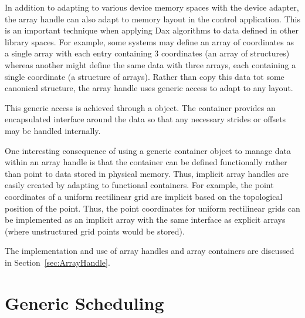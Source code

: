In addition to adapting to various device memory spaces with the device
adapter, the array handle can also adapt to memory layout in the control
application. This is an important technique when applying Dax algorithms to
data defined in other library spaces. For example, some systems may define
an array of coordinates as a single array with each entry containing 3
coordinates (an array of structures) whereas another might define the same
data with three arrays, each containing a single coordinate (a structure of
arrays). Rather than copy this data tot some canonical structure, the array
handle uses generic access to adapt to any layout.


This generic access is achieved through a 
 object. The container provides an encapsulated
interface around the data so that any necessary strides or offsets may be
handled internally.


One interesting consequence of using a generic container object to manage
data within an array handle is that the container can be defined
functionally rather than point to data stored in physical memory. Thus,
implicit array handles are easily created by adapting to functional
containers. For example, the point coordinates of a uniform rectilinear
grid are implicit based on the topological position of the point. Thus, the
point coordinates for uniform rectilinear grids can be implemented as an
implicit array with the same interface as explicit arrays (where
unstructured grid points would be stored).

The implementation and use of array handles and array containers are
discussed in Section~\ref{sec:ArrayHandle}.


\section{Generic Scheduling}
\label{sec:GenericScheduling}


